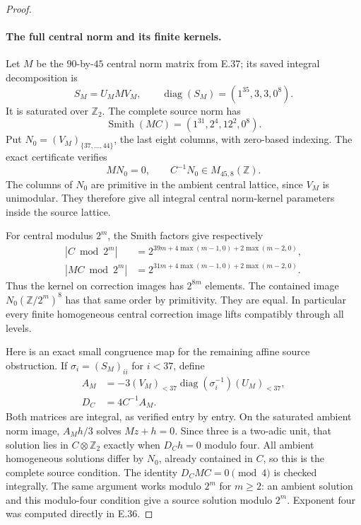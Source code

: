 \begin{proof}
\paragraph{The full central norm and its finite kernels.}
Let $M$ be the $90$-by-$45$ central norm matrix
from E.37; its saved integral decomposition is
\[
 S_M=U_M M V_M,\qquad
 \operatorname{diag}(S_M)=(1^{35},3,3,0^8).
 \tag{E.41.8}
\]
It is saturated over $\mathbb Z_2$.
The complete source norm has
\[
             \operatorname{Smith}(MC)
                      =(1^{31},2^4,12^2,0^8).
 \tag{E.41.9}
\]
Put $N_0=(V_M)_{\{37,\ldots,44\}}$,
the last eight columns, with zero-based indexing.
The exact certificate verifies
\[
           M N_0=0,\qquad C^{-1}N_0\in M_{45,8}(\mathbb Z).
 \tag{E.41.10}
\]
The columns of $N_0$ are primitive in the
ambient central lattice, since $V_M$ is
unimodular.  They therefore give all integral
central norm-kernel parameters inside the
source lattice.

For central modulus $2^m$, the Smith factors
give respectively
\[
 \begin{split}
 |C\bmod2^m|&=
  2^{39m+4\max(m-1,0)+2\max(m-2,0)},\\
 |MC\bmod2^m|&=
  2^{31m+4\max(m-1,0)+2\max(m-2,0)}.
 \end{split}
 \tag{E.41.11}
\]
Thus the kernel on correction images has
$2^{8m}$ elements.
The contained image $N_0(\mathbb Z/2^m)^8$
has that same order by primitivity.
They are equal.  In particular every finite
homogeneous central correction image lifts
compatibly through all levels.

Here is an exact small congruence map for the
remaining affine source obstruction.
If $\sigma_i=(S_M)_{ii}$ for $i<37$, define
\[
 \begin{split}
 A_M&=-3(V_M)_{<37}
       \operatorname{diag}(\sigma_i^{-1})
       (U_M)_{<37},\\
 D_C&=4C^{-1}A_M .
 \end{split}
 \tag{E.41.12}
\]
Both matrices are integral, as verified entry
by entry.  On the saturated ambient norm image,
$A_Mh/3$ solves $Mz+h=0$.
Since three is a two-adic unit, that solution
lies in $C\otimes\mathbb Z_2$ exactly when
$D_Ch=0$ modulo four.
All ambient homogeneous solutions differ by
$N_0$, already contained in $C$, so this is
the complete source condition.
The identity $D_C MC=0\pmod4$ is checked
integrally.  The same argument works modulo
$2^m$ for $m\ge2$: an ambient solution and this
modulo-four condition give a source solution
modulo $2^m$.  Exponent four was computed
directly in E.36.


\end{proof}
